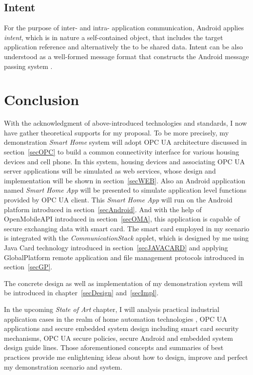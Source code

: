 \subsection{Intent} \label{secIntent}
For the purpose of inter- and intra- application communication, Android applies \emph{intent}, which is in nature a self-contained object, that includes the target application reference and alternatively the to be shared data.  Intent can be also understood as a well-formed message format that constructs the Android message passing system \cite{android_secure_inter}.

\section{Conclusion}
With the acknowledgment of above-introduced technologies and standards, I now have gather theoretical   supports for my proposal. To be more precisely, my demonstration \emph{Smart Home} system will adopt OPC UA architecture discussed in section~\ref{secOPC} to build a common connectivity interface for various housing devices and cell phone.  In this system, housing devices and associating OPC UA server applications will be simulated as web services, whose design and implementation will be shown in section~\ref{secWEB}. Also an Android application named \emph{Smart Home App} will be presented to simulate application level functions provided by OPC UA client. This \emph{Smart Home App} will run on the Android platform introduced in section~\ref{secAndroid}. And with the help of OpenMobileAPI introduced in section~\ref{secOMA}, this application is capable of secure exchanging data with smart card. The smart card employed in my scenario is integrated with the \emph{CommunicationStack} applet, which is designed by me using Java Card technology introduced in section~\ref{secJAVACARD} and applying GlobalPlatform remote application and file management protocols introduced in section~\ref{secGP}.

The concrete design as well as implementation of my demonstration system will be introduced in chapter~\ref{secDesign} and~\ref{secImpl}.

In the upcoming \emph{State of Art} chapter, I will analysis practical industrial application cases in the realm of home automation technologies , OPC UA applications and secure embedded system design including smart card security mechanisms, OPC UA secure policies, secure Android and embedded system design guide lines. Those aforementioned concepts and summaries of best practices provide me enlightening ideas about how to design, improve and perfect my demonstration scenario and system.